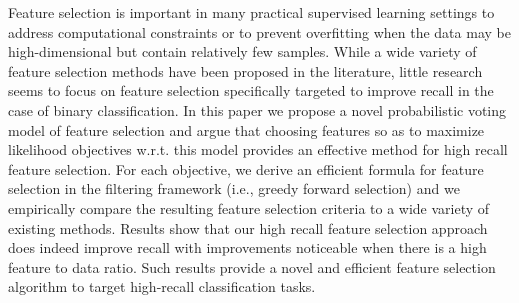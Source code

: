 Feature selection is important in many practical supervised learning
settings to address computational constraints or to prevent
overfitting when the data may be high-dimensional but contain
relatively few samples.  While a wide variety of feature selection
methods have been proposed in the literature, little research seems to
focus on feature selection specifically targeted to improve recall in
the case of binary classification.  In this paper we propose a novel
probabilistic voting model of feature selection and argue that
choosing features so as to maximize likelihood objectives w.r.t. this
model provides an effective method for high recall feature selection.
For each objective, we derive an efficient formula for feature
selection in the filtering framework (i.e., greedy forward selection)
and we empirically compare the resulting feature selection criteria to
a wide variety of existing methods.  Results show that our high recall
feature selection approach does indeed improve recall with
improvements noticeable when there is a high feature to data ratio.
Such results provide a novel and efficient feature selection algorithm
to target high-recall classification tasks.



